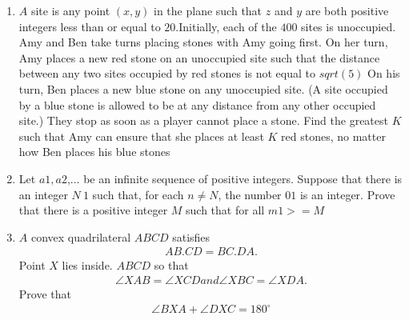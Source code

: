 \documentclass[12pt,-letter paper]{article}
\begin{document}
\begin{enumerate}
\item $A$ site is any point $(x,y)$ in the plane such that $z$ and $y$ are both positive integers less than or equal to $20$.Initially, each of the $400$ sites is unoccupied. Amy and Ben take turns placing stones with Amy going first. On her turn, Amy places a new red stone on an unoccupied site such that the distance between any two sites occupied by red stones is not equal to $sqrt(5)$ On his turn, Ben places a new blue stone on any unoccupied site. (A site occupied by a blue stone is allowed to be at any distance from any other occupied site.) They stop as soon as a player cannot place a stone. Find the greatest $K$ such that Amy can ensure that she places at least $K$ red stones, no matter how Ben places his blue stones
\item Let $a1,a2$,... be an infinite sequence of positive integers. Suppose that there is an integer $N\>1$ such that, for each $n\neq N$, the number $01$ is an integer. Prove that there is a positive integer $M$ such that for all $m1>=M$
\item $A$ convex quadrilateral $ABCD$ satisfies \begin{align}AB.CD=BC.DA.\end{align} Point $X$ lies inside. $ABCD$ so that \begin{align}\angle XAB=\angle XCD and \angle XBC=\angle XDA.\end{align} Prove that\begin{align}\angle BXA+\angle DXC=180^\circ\end{align}

\end{enumerate}
\end{document}
